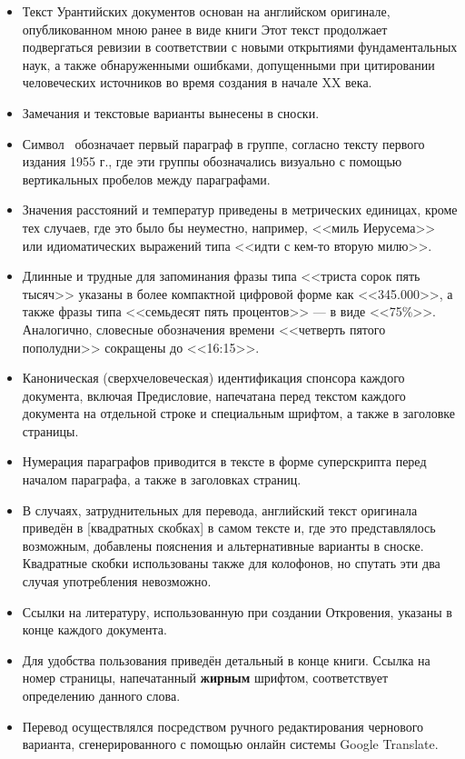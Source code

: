 \begin{itemize}
\item Текст Урантийских документов основан на английском оригинале, опубликованном мною ранее в виде книги
      Этот текст продолжает подвергаться ревизии в соответствии с новыми открытиями фундаментальных наук, а также обнаруженными
      ошибками, допущенными при цитировании человеческих источников во время создания
       в начале XX века.
\item Замечания и текстовые варианты вынесены в сноски.
\item Символ \pc\ обозначает первый параграф в группе, согласно тексту первого издания 1955 г., где эти группы обозначались визуально с помощью вертикальных пробелов между параграфами.
\item Значения расстояний и температур приведены в метрических единицах, кроме тех случаев, где это было бы неуместно,
      например, <<миль Иерусема>> или идиоматических выражений типа <<идти с кем-то вторую милю>>.
\item Длинные и трудные для запоминания фразы типа <<триста сорок пять тысяч>> указаны в более компактной цифровой
      форме как <<345.000>>, а также фразы типа <<семьдесят пять процентов>> --- в виде <<75\%>>.
      Аналогично, словесные обозначения времени <<четверть пятого пополудни>> сокращены до <<16:15>>.
\item Каноническая (сверхчеловеческая) идентификация спонсора каждого документа, включая Предисловие,
      напечатана перед текстом каждого документа на отдельной строке и специальным шрифтом, а также в заголовке страницы.
\item Нумерация параграфов приводится в тексте в форме суперскрипта перед началом параграфа, а также в заголовках страниц.
\item В случаях, затруднительных для перевода, английский текст оригинала приведён в
      [квадратных скобках] в самом тексте и, где это представлялось возможным,
      добавлены пояснения и альтернативные варианты в сноске.
      Квадратные скобки использованы также для колофонов, но спутать эти два случая употребления невозможно.
\item Ссылки на литературу, использованную при создании Откровения, указаны в конце каждого документа.
\item Для удобства пользования приведён детальный  в конце книги.
      Ссылка на номер страницы, напечатанный \textbf{жирным} шрифтом, соответствует определению данного слова.
\item Перевод осуществлялся посредством ручного редактирования чернового варианта, сгенерированного с помощью онлайн системы
      Google Translate.
\end{itemize}

